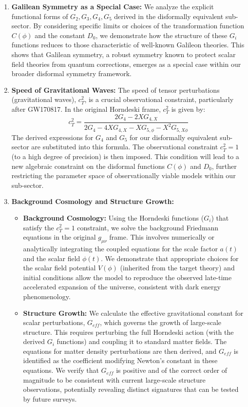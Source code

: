 \documentclass[twocolumn]{aastex631}
\begin{document}
\begin{enumerate}
\begin{enumerate}
\begin{enumerate}
    \item \textbf{Galilean Symmetry as a Special Case:} We analyze the explicit functional forms of $G_2, G_3, G_4, G_5$ derived in the disformally equivalent sub-sector. By considering specific limits or choices of the transformation function $C(\phi)$ and the constant $D_0$, we demonstrate how the structure of these $G_i$ functions reduces to those characteristic of well-known Galileon theories. This shows that Galilean symmetry, a robust symmetry known to protect scalar field theories from quantum corrections, emerges as a special case within our broader disformal symmetry framework.

    \item \textbf{Speed of Gravitational Waves:} The speed of tensor perturbations (gravitational waves), $c_T^2$, is a crucial observational constraint, particularly after GW170817. In the original Horndeski frame, $c_T^2$ is given by:
    \begin{equation}
    c_T^2 = \frac{2G_4 - 2XG_{4,X}}{2G_4 - 4XG_{4,X} - XG_{5,\phi} - X^2 G_{5,X\phi}}
    \end{equation}
    The derived expressions for $G_4$ and $G_5$ for our disformally equivalent sub-sector are substituted into this formula. The observational constraint $c_T^2 = 1$ (to a high degree of precision) is then imposed. This condition will lead to a new algebraic constraint on the disformal functions $C(\phi)$ and $D_0$, further restricting the parameter space of observationally viable models within our sub-sector.

    \item \textbf{Background Cosmology and Structure Growth:}
    \begin{itemize}
        \item \textbf{Background Cosmology:} Using the Horndeski functions ($G_i$) that satisfy the $c_T^2=1$ constraint, we solve the background Friedmann equations in the original $g_{\mu\nu}$ frame. This involves numerically or analytically integrating the coupled equations for the scale factor $a(t)$ and the scalar field $\phi(t)$. We demonstrate that appropriate choices for the scalar field potential $V(\phi)$ (inherited from the target theory) and initial conditions allow the model to reproduce the observed late-time accelerated expansion of the universe, consistent with dark energy phenomenology.
        \item \textbf{Structure Growth:} We calculate the effective gravitational constant for scalar perturbations, $G_{eff}$, which governs the growth of large-scale structure. This requires perturbing the full Horndeski action (with the derived $G_i$ functions) and coupling it to standard matter fields. The equations for matter density perturbations are then derived, and $G_{eff}$ is identified as the coefficient modifying Newton's constant in these equations. We verify that $G_{eff}$ is positive and of the correct order of magnitude to be consistent with current large-scale structure observations, potentially revealing distinct signatures that can be tested by future surveys.
    \end{itemize}


\end{enumerate}
\end{enumerate}
\end{enumerate}
\end{document}

